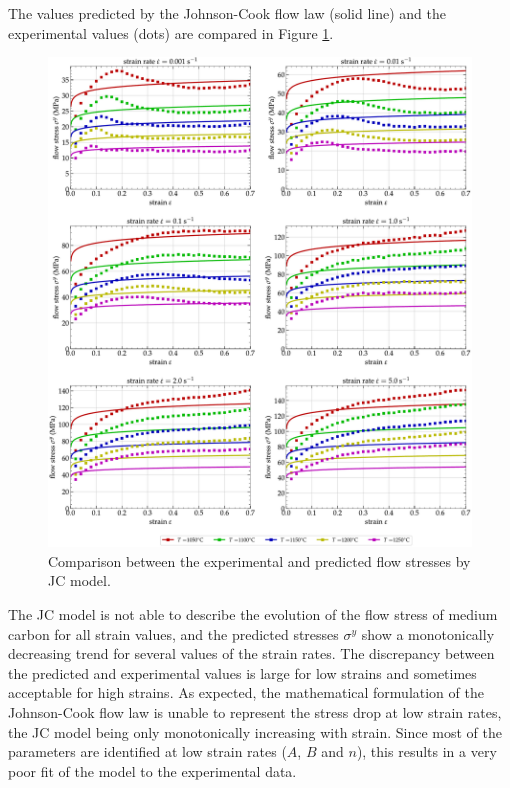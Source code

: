\documentclass[twoside,english,1p,final,sort&compress]{elsarticle}
\theoremstyle{plain}
\begin{document}
The values predicted by the Johnson-Cook flow law (solid line) and the experimental values (dots) are compared in Figure \ref{fig:CompExp-JC-6}.
\begin{figure}[!ht]
\centering
\includegraphics[width=\columnwidth]{Figures/CompExp-JC-6}
\caption{Comparison between the experimental and predicted flow stresses by JC model.}
\label{fig:CompExp-JC-6}
\end{figure}
The JC model is not able to describe the evolution of the flow stress of medium carbon for all strain values, and the predicted stresses $\sigma^y$ show a monotonically decreasing trend for several values of the strain rates.
The discrepancy between the predicted and experimental values is large for low strains and sometimes acceptable for high strains.
As expected, the mathematical formulation of the Johnson-Cook flow law is unable to represent the stress drop at low strain rates, the JC model being only monotonically increasing with strain.
Since most of the parameters are identified at low strain rates ($A$, $B$ and $n$), this results in a very poor fit of the model to the experimental data.
\end{document}
